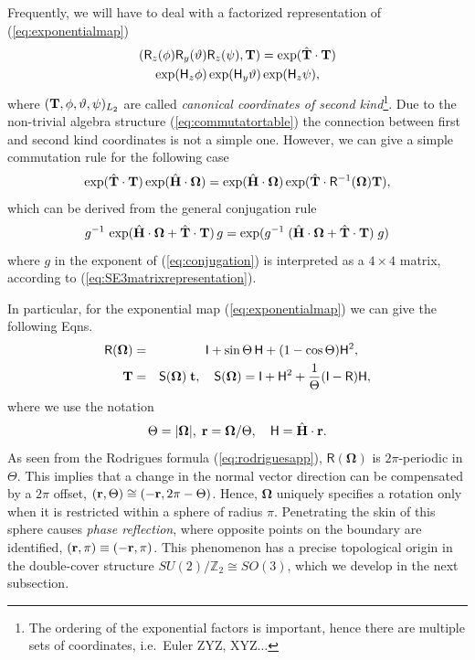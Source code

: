 \documentclass[journal]{IEEEtran}
\newcommand{\bfOmega}{\boldsymbol{\Omega}}
\newcommand{\beq}{\begin{equation}}
\newcommand{\eeq}{\end{equation}}
\newcommand{\beqar}{\begin{eqnarray}}
\newcommand{\eeqar}{\end{eqnarray}}
\begin{document}
Frequently, we will have to deal with a factorized representation of (\ref{eq:exponentialmap})
\begin{multline}
    ( \mathsf{R}_z(\phi)\mathsf{R}_y(\vartheta)\mathsf{R}_z(\psi),{\bf T}) = \exp( \hat{\bf T}\cdot {\bf T} ) \\
    \exp( \mathsf{H}_z\phi)\exp( \mathsf{H}_y\vartheta)\exp( \mathsf{H}_z\psi),
    \label{eq:Lie2ndkind}
\end{multline}
where $({\bf T},\phi,\vartheta,\psi)_{L_2}$ are called {\em canonical coordinates of second kind}\footnote{The ordering of the exponential factors is important, hence there are multiple sets
of coordinates, i.e.\ Euler ZYZ, XYZ$\ldots$}.
Due to the non-trivial algebra structure (\ref{eq:commutatortable}) the connection between first
and second kind coordinates is not a simple one.
However, we can give a simple commutation rule for the following case
\beq
    \exp(\hat{\bf T}\cdot{\bf T})\exp(\hat{\bf H}\cdot\bfOmega) =
    \exp(\hat{\bf H}\cdot\bfOmega)\exp(\hat{\bf T}\cdot\mathsf{R}^{-1}(\bfOmega){\bf T}),
    \label{eq:TOmegacommute}
\eeq
which can be derived from the general conjugation rule
\beq
    g^{-1}\,\exp(\hat{\bf H}\cdot\bfOmega+\hat{\bf T}\cdot{\bf T})\, g =
    \exp(g^{-1}\; (\hat{\bf H}\cdot\bfOmega+\hat{\bf T}\cdot{\bf T})\; g) \label{eq:conjugation}
\eeq
where $g$ in the exponent of (\ref{eq:conjugation}) is interpreted as a $4\times 4$ matrix, according to
(\ref{eq:SE3matrixrepresentation}).

In particular, for the exponential map (\ref{eq:exponentialmap}) we can give the following Eqns.
\beqar
    \mathsf{R}(\bfOmega) &=& \mathsf{I}+\sin\Theta\, \mathsf{H} + (1-\cos\Theta)\mathsf{H}^2,
    \quad \label{eq:rodriguesapp} \\
    {\bf T} &=& \mathsf{S}(\bfOmega)\; {\bf t},\quad
    \mathsf{S}(\bfOmega) = \mathsf{I} + \mathsf{H}^2 +  {1\over\Theta}(\mathsf{I}-\mathsf{R})\mathsf{H}, \nonumber
\eeqar
where we use the notation
\beq
    \Theta=|\bfOmega|,\; {\bf r} = \bfOmega/\Theta,\quad
    \mathsf{H}=\hat{\bf H}\cdot{\bf r}. \label{eq:expnotation}
\eeq
As seen from the Rodrigues formula (\ref{eq:rodriguesapp}), $\mathsf{R}(\bfOmega)$ is $2\pi$-periodic in $\Theta$.
This implies that a change in the normal vector direction can be compensated by a $2\pi$ offset,
$({\bf r},\Theta) \cong (-{\bf r},2\pi-\Theta)$. Hence, $\bfOmega$ uniquely specifies a rotation
only when it is restricted within a sphere of radius $\pi$. Penetrating the skin of this sphere
causes {\em phase reflection}, where opposite points on the boundary are identified,
$({\bf r},\pi) \equiv (-{\bf r},\pi)$.
This phenomenon has a precise topological origin in the double-cover structure
$SU(2)/\mathbb{Z}_2 \cong SO(3)$, which we develop in the next subsection.
\end{document}
